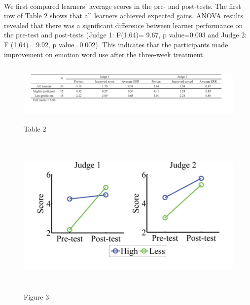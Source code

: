 \documentclass[a4paper,12pt,oneside]{article}
\begin{document}
\paragraph{}
We first compared learners’ average scores in the pre- and post-tests. The first row of Table 2 shows that all learners achieved expected gains. ANOVA results revealed that there was a significant difference between learner performance on the pre-test and post-tests (Judge 1: F(1,64)= 9.67, p value=0.003 and Judge 2: F (1,64)= 9.92, p value=0.002). This indicates that the participants made improvement on emotion word use after the three-week treatment. 

\begin{figure}[H]
\includegraphics[height=3cm,width=15cm]{Table2.png}
\centering
\caption{Table 2}
\end{figure}

\begin{figure}[H]
\includegraphics[height=8cm,width=16cm]{Figure3.png}
\centering
\caption{Figure 3}
\end{figure}
\end{document}
